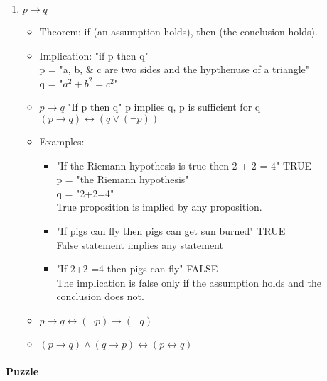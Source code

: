 \documentclass[9pt, letterpaper, oneside]{article}
\begin{document}
\begin{enumerate}
	\item $p \to q$
	\begin{itemize}
	\item Theorem: if (an assumption holds), then (the conclusion holds).
	\item Implication: "if p then q"\\
		p = "a, b, \& c are two sides and the hypthenuse of a triangle"\\
		q = "$a^2 + b^2 = c^2$"
	\item $p \to q$ "If p then q" p implies q, p is sufficient for q\\
		$(p \to q) \leftrightarrow (q \vee (\neg p))$
	\item Examples: 
		\begin{itemize}
			\item "If the Riemann hypothesis is true then 2 + 2 = 4" TRUE\\
			p = "the Riemann hypothesis"\\
			q = "2+2=4"\\
			True proposition is implied by any proposition.
			\item "If pigs can fly then pigs can get sun burned" TRUE\\
			False statement implies any statement
			\item "If 2+2 =4 then pigs can fly" FALSE\\
			The implication is false only if the assumption holds and the conclusion does not.
		\end{itemize}
	\item $p \to q \leftrightarrow (\neg p) \to (\neg q)$
	\item $(p \to q) \wedge (q \to p) \leftrightarrow (p \leftrightarrow q)$
	\end{itemize}
\end{enumerate}

\paragraph{Puzzle}
\end{document}
